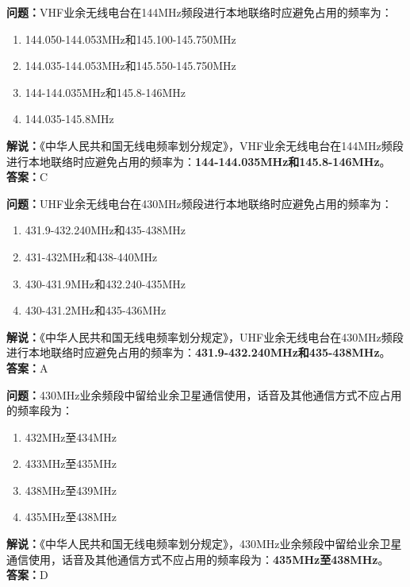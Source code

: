 \bigskip


\noindent\textbf{问题：}VHF业余无线电台在144MHz频段进行本地联络时应避免占用的频率为：
\begin{enumerate}[label=\Alph*), leftmargin=3em]
  \item 144.050-144.053MHz和145.100-145.750MHz
  \item 144.035-144.053MHz和145.550-145.750MHz
  \item 144-144.035MHz和145.8-146MHz
  \item 144.035-145.8MHz
\end{enumerate}
\noindent\textbf{解说：}《中华人民共和国无线电频率划分规定》，VHF业余无线电台在144MHz频段进行本地联络时应避免占用的频率为：\textbf{144-144.035MHz和145.8-146MHz}。\\\noindent\textbf{答案：}C



\bigskip


\noindent\textbf{问题：}UHF业余无线电台在430MHz频段进行本地联络时应避免占用的频率为：
\begin{enumerate}[label=\Alph*), leftmargin=3em]
  \item 431.9-432.240MHz和435-438MHz
  \item 431-432MHz和438-440MHz
  \item 430-431.9MHz和432.240-435MHz
  \item 430-431.2MHz和435-436MHz
\end{enumerate}
\noindent\textbf{解说：}《中华人民共和国无线电频率划分规定》，UHF业余无线电台在430MHz频段进行本地联络时应避免占用的频率为：\textbf{431.9-432.240MHz和435-438MHz}。\\\noindent\textbf{答案：}A



\bigskip


\noindent\textbf{问题：}430MHz业余频段中留给业余卫星通信使用，话音及其他通信方式不应占用的频率段为：
\begin{enumerate}[label=\Alph*), leftmargin=3em]
  \item 432MHz至434MHz
  \item 433MHz至435MHz
  \item 438MHz至439MHz
  \item 435MHz至438MHz
\end{enumerate}
\noindent\textbf{解说：}《中华人民共和国无线电频率划分规定》，430MHz业余频段中留给业余卫星通信使用，话音及其他通信方式不应占用的频率段为：\textbf{435MHz至438MHz}。\\\noindent\textbf{答案：}D



